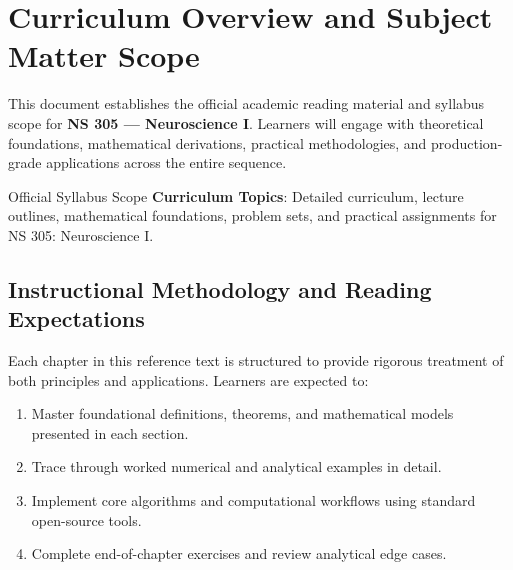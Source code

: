 \section{Curriculum Overview and Subject Matter Scope}

This document establishes the official academic reading material and syllabus scope for \textbf{NS 305 --- Neuroscience I}. Learners will engage with theoretical foundations, mathematical derivations, practical methodologies, and production-grade applications across the entire sequence.

\begin{InsightBox}{Official Syllabus Scope}
  \textbf{Curriculum Topics}: Detailed curriculum, lecture outlines, mathematical foundations, problem sets, and practical assignments for NS 305: Neuroscience I.
\end{InsightBox}

\subsection{Instructional Methodology and Reading Expectations}

Each chapter in this reference text is structured to provide rigorous treatment of both principles and applications. Learners are expected to:
\begin{enumerate}
  \item Master foundational definitions, theorems, and mathematical models presented in each section.
  \item Trace through worked numerical and analytical examples in detail.
  \item Implement core algorithms and computational workflows using standard open-source tools.
  \item Complete end-of-chapter exercises and review analytical edge cases.
\end{enumerate}

